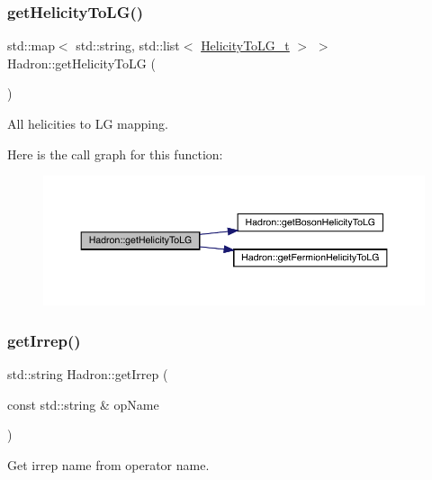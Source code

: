 \subsubsection{\texorpdfstring{getHelicityToLG()}{getHelicityToLG()}}
{\footnotesize\ttfamily std\+::map$<$ std\+::string, std\+::list$<$ \mbox{\hyperlink{structHadron_1_1HelicityToLG__t}{Helicity\+To\+L\+G\+\_\+t}} $>$ $>$ Hadron\+::get\+Helicity\+To\+LG (\begin{DoxyParamCaption}{ }\end{DoxyParamCaption})}



All helicities to LG mapping. 

Here is the call graph for this function\+:
\nopagebreak
\begin{figure}[H]
\begin{center}
\leavevmode
\includegraphics[width=350pt]{d1/daf/namespaceHadron_aeab17d669da3fa4a904236091bd5384f_cgraph}
\end{center}
\end{figure}
\mbox{\label{namespaceHadron_a33d1d1e15a13f881d974049a8ae1c3dc}} 
\subsubsection{\texorpdfstring{getIrrep()}{getIrrep()}}
{\footnotesize\ttfamily std\+::string Hadron\+::get\+Irrep (\begin{DoxyParamCaption}\item[{const std\+::string \&}]{op\+Name }\end{DoxyParamCaption})}



Get irrep name from operator name. 

